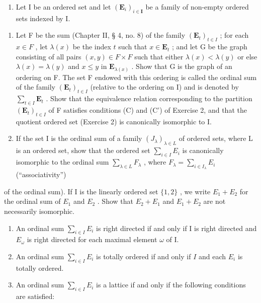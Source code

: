 \begin{enumerate}
\def\labelenumi{\arabic{enumi}.}
\setcounter{enumi}{2}
\tightlist
\item
  Let I be an ordered set and let \((\mathbf{E}_i)_{i\in \mathbf{I}}\) be a family of non-empty ordered sets indexed by I.
\end{enumerate}

\begin{enumerate}
\def\labelenumi{(\alph{enumi})}
\item
  Let F be the sum (Chapter II, § 4, no. 8) of the family \((\mathbf{E}_t)_{t \in I}\) ; for each \(x \in F\) , let \(\lambda(x)\) be the index \(t\) such that \(x \in \mathbf{E}_t\) ; and let G be the graph consisting of all pairs \((x, y) \in F \times F\) such that either \(\lambda(x) < \lambda(y)\) or else \(\lambda(x) = \lambda(y)\) and \(x \leqslant y\) in \(\mathbf{E}_{\lambda(x)}\) . Show that G is the graph of an ordering on F. The set F endowed with this ordering is called the ordinal sum of the family \((\mathbf{E}_t)_{t \in I}\) (relative to the ordering on I) and is denoted by \(\sum_{t \in I} \mathbf{E}_t\) . Show that the equivalence relation corresponding to the partition \((\mathbf{E}_t)_{t \in I}\) of F satisfies conditions (C) and (C') of Exercise 2, and that the quotient ordered set (Exercise 2) is canonically isomorphic to I.
\item
  If the set I is the ordinal sum of a family \((J_{\lambda})_{\lambda\in L}\) of ordered sets, where L is an ordered set, show that the ordered set \(\sum_{i\in I}E_{i}\) is canonically isomorphic to the ordinal sum \(\sum_{\lambda\in L}F_{\lambda}\) , where \(F_{\lambda}=\sum_{i\in I_{\lambda}}E_{i}\) (``associativity'')
\end{enumerate}

of the ordinal sum). If I is the linearly ordered set \(\{1, 2\}\) , we write \(E_{1} + E_{2}\) for the ordinal sum of \(E_{1}\) and \(E_{2}\) . Show that \(E_{2} + E_{1}\) and \(E_{1} + E_{2}\) are not necessarily isomorphic.

\begin{enumerate}
\def\labelenumi{(\alph{enumi})}
\setcounter{enumi}{2}
\item
  An ordinal sum \(\sum_{i\in I}E_i\) is right directed if and only if I is right directed and \(E_{\omega}\) is right directed for each maximal element \(\omega\) of I.
\item
  An ordinal sum \(\sum_{i\in I}E_i\) is totally ordered if and only if \(I\) and each \(E_i\) is totally ordered.
\item
  An ordinal sum \(\sum_{i\in I}E_i\) is a lattice if and only if the following conditions are satisfied:
\end{enumerate}

